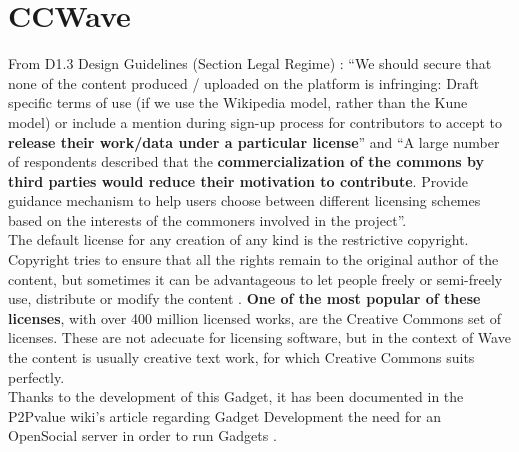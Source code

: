 \thispagestyle{sectioned}
\chapter{CCWave}
\label{subsec:cc_intro}
From  D1.3 Design Guidelines (Section Legal Regime) \cite{ref:p2pvalue}: ``We should secure that none of the content produced / uploaded on the platform is infringing: Draft specific terms of use (if we use the Wikipedia model, rather than the Kune model)  or include a mention during sign-up process for contributors to accept to \textbf{release their work/data under a particular license}'' and ``A large number of respondents described that the \textbf{commercialization of the commons by third parties would reduce their motivation to contribute}. Provide guidance mechanism to help users choose between different licensing schemes based on the interests of the commoners involved in the project''.\\[.2cm]
The default license for any creation of any kind is the restrictive copyright. Copyright tries to ensure that all the rights remain to the original author of the content, but sometimes it can be advantageous to let people freely or semi-freely use, distribute or modify the content \cite{ref:oss_why}. \textbf{One of the most popular of these licenses}, with over 400 million \cite{ref:the_power_of_open} licensed works, are the Creative Commons set of licenses. These are not adecuate for licensing software, but in the context of Wave the content is usually creative text work, for which Creative Commons suits perfectly.\\[.2cm]
Thanks to the development of this Gadget, it has been documented in the P2Pvalue wiki's article regarding Gadget Development the need for an OpenSocial server in order to run Gadgets \cite{ref:gadget_development}.

